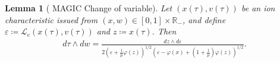 \documentclass{article}
\newtheorem{lem}{Lemma}[section]
\numberwithin{equation}{section}
\newcommand{\intern}[1]{{\color{RoyalBlue} #1}} %
\newcommand{\ee}{\varepsilon} %
\begin{document}
{%
}

\begin{lem}[\intern{MAGIC }Change of variable]\label{lem:magic_change_variable}
	Let $(x(\tau),v(\tau))$ be an ion characteristic issued from $(x,w) \in [0,1] \times \mathbb{R}_-$, and define $\ee \coloneqq \mathcal{L}_e(x(\tau),v(\tau))$ and $z\coloneqq x(\tau)$. Then
	\begin{align*}
		d\tau \wedge dw = \frac{dz \wedge d\ee}{2\left(\ee + \frac{1}{\mu} \varphi(z)\right)^{1/2} \left(\ee - \varphi(x) + \left(1+\frac{1}{\mu}\right) \varphi(z)\right)^{1/2}}.
	\end{align*}
\end{lem}
\end{document}
